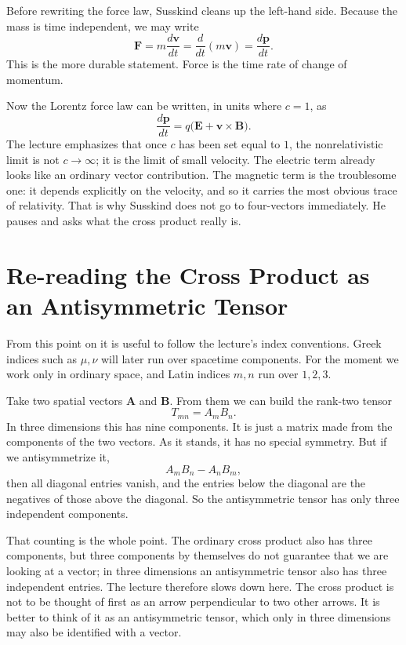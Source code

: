 Before rewriting the force law, Susskind cleans up the left-hand side. Because the mass is time independent, we may write
\begin{equation}
\mathbf F
=
m\frac{d\mathbf v}{dt}
=
\frac{d}{dt}(m\mathbf v)
=
\frac{d\mathbf p}{dt}.
\end{equation}
This is the more durable statement. Force is the time rate of change of momentum.

Now the Lorentz force law can be written, in units where \(c=1\), as
\begin{equation}
\frac{d\mathbf p}{dt}
=
q\bigl(\mathbf E+\mathbf v\times\mathbf B\bigr).
\end{equation}
The lecture emphasizes that once \(c\) has been set equal to \(1\), the nonrelativistic limit is not \(c\to\infty\); it is the limit of small velocity. The electric term already looks like an ordinary vector contribution. The magnetic term is the troublesome one: it depends explicitly on the velocity, and so it carries the most obvious trace of relativity. That is why Susskind does not go to four-vectors immediately. He pauses and asks what the cross product really is.

\section{Re-reading the Cross Product as an Antisymmetric Tensor}

From this point on it is useful to follow the lecture's index conventions. Greek indices such as \(\mu,\nu\) will later run over spacetime components. For the moment we work only in ordinary space, and Latin indices \(m,n\) run over \(1,2,3\).

Take two spatial vectors \(\mathbf A\) and \(\mathbf B\). From them we can build the rank-two tensor
\begin{equation}
T_{mn}=A_mB_n.
\end{equation}
In three dimensions this has nine components. It is just a matrix made from the components of the two vectors. As it stands, it has no special symmetry. But if we antisymmetrize it,
\begin{equation}
A_mB_n-A_nB_m,
\end{equation}
then all diagonal entries vanish, and the entries below the diagonal are the negatives of those above the diagonal. So the antisymmetric tensor has only three independent components.

That counting is the whole point. The ordinary cross product also has three components, but three components by themselves do not guarantee that we are looking at a vector; in three dimensions an antisymmetric tensor also has three independent entries. The lecture therefore slows down here. The cross product is not to be thought of first as an arrow perpendicular to two other arrows. It is better to think of it as an antisymmetric tensor, which only in three dimensions may also be identified with a vector.

